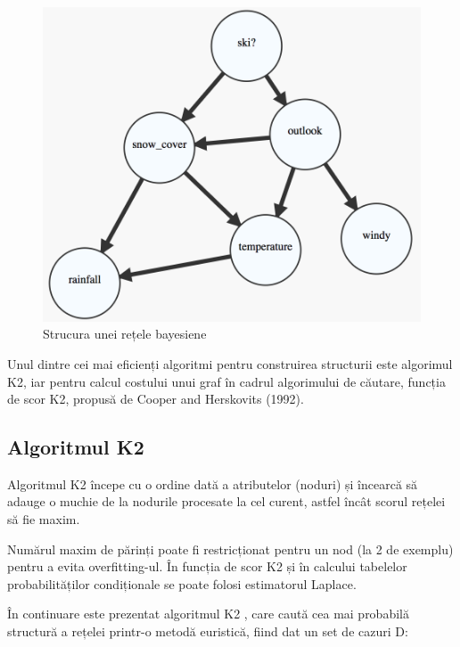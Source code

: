 \begin{figure}[th]
\centering
\includegraphics[scale=0.4]{Figures/structure}
\decoRule
\caption{Strucura unei rețele bayesiene}
\label{fig:structure}
\end{figure}

Unul dintre cei mai eficienți algoritmi pentru construirea structurii este algorimul K2, iar pentru calcul costului unui graf în cadrul algorimului de căutare, funcția de scor K2, propusă de Cooper and Herskovits (1992). \cite{carvalho2009scoring}

\subsection{Algoritmul K2}

Algoritmul K2 începe cu o ordine dată a atributelor (noduri) și încearcă să adauge o muchie de la nodurile procesate la cel curent, astfel încât scorul rețelei să fie maxim.

Numărul maxim de părinți poate fi restricționat pentru un nod (la 2 de exemplu) pentru a evita overfitting-ul. În funcția de scor K2 și în calcului tabelelor probabilităților condiționale se poate folosi estimatorul Laplace. \cite{ruiz2005illustration}

În continuare este prezentat algoritmul K2 \cite{cooper1992bayesian}, care caută cea mai probabilă structură a rețelei printr-o metodă euristică, fiind dat un set de cazuri D:

